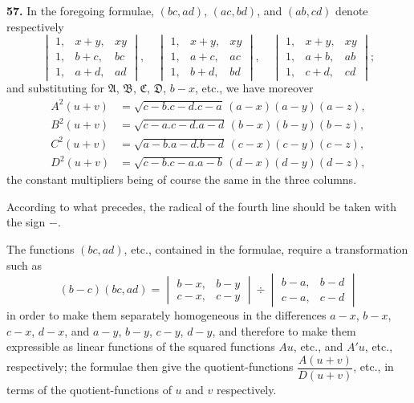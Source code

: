 \documentclass[12pt,a4paper]{article}
\theoremstyle{definition}
\begin{document}
\noindent\textbf{57.}\quad
In the foregoing formulae, $(bc, ad)$, $(ac, bd)$, and $(ab, cd)$ denote respectively
\[
\begin{vmatrix}
1, & x + y, & xy \\
1, & b + c, & bc \\
1, & a + d, & ad
\end{vmatrix},\quad
\begin{vmatrix}
1, & x + y, & xy \\
1, & a + c, & ac \\
1, & b + d, & bd
\end{vmatrix},\quad
\begin{vmatrix}
1, & x + y, & xy \\
1, & a + b, & ab \\
1, & c + d, & cd
\end{vmatrix};
\]
and substituting for $\mathfrak{A}$, $\mathfrak{B}$, $\mathfrak{C}$, $\mathfrak{D}$, $b - x$, etc., we have moreover
\begin{align*}
A^2(u + v) &= \sqrt{c - b . c - d . c - a}\, (a - x)(a - y)(a - z), \\
B^2(u + v) &= \sqrt{c - a . c - d . a - d}\, (b - x)(b - y)(b - z), \\
C^2(u + v) &= \sqrt{a - b . a - d . b - d}\, (c - x)(c - y)(c - z), \\
D^2(u + v) &= \sqrt{c - b . c - a . a - b}\, (d - x)(d - y)(d - z),
\end{align*}
the constant multipliers being of course the same in the three columns.

According to what precedes, the radical of the fourth line should be taken with the sign $-$.

The functions $(bc, ad)$, etc., contained in the formulae, require a transformation such as
\[
(b - c)(bc, ad) = \begin{vmatrix} b - x, & b - y \\ c - x, & c - y \end{vmatrix} \div \begin{vmatrix} b - a, & b - d \\ c - a, & c - d \end{vmatrix}
\]
in order to make them separately homogeneous in the differences $a - x$, $b - x$, $c - x$, $d - x$, and $a - y$, $b - y$, $c - y$, $d - y$, and therefore to make them expressible as linear functions of the squared functions $Au$, etc., and $A'u$, etc., respectively; the formulae then give the quotient-functions $\dfrac{A(u + v)}{D(u + v)}$, etc., in terms of the quotient-functions of $u$ and $v$ respectively.
\end{document}
